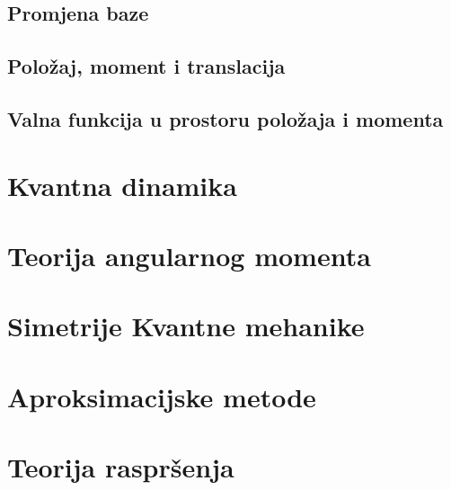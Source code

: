 \documentclass{article}
\numberwithin{equation}{section}
\begin{document}
\subsection{Promjena baze}

\subsection{Položaj, moment i translacija}

\subsection{Valna funkcija u prostoru položaja i momenta}




\newpage
\section{Kvantna dinamika}

\newpage
\section{Teorija angularnog momenta}

\newpage
\section{Simetrije Kvantne mehanike}

\newpage
\section{Aproksimacijske metode}

\newpage
\section{Teorija raspršenja}
\end{document}
